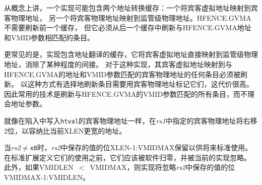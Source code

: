 \begin{commentary}
  从概念上讲，一个实现可能包含两个地址转换缓存：一个将宾客虚拟地址映射到宾客物理地址，
  另一个将宾客物理地址映射到监管级物理地址。HFENCE.GVMA不需要刷新前一个缓存，
  但它必须从后一个缓存中刷新与HFENCE.GVMA地址和VMID参数相匹配的条目。

更常见的是，实现包含地址翻译的缓存，它将宾客虚拟地址直接映射到监管级物理地址，消除了某种程度的间接。
对于这种实现，其宾客虚拟地址映射到与HFENCE.GVMA的地址和VMID参数匹配的宾客物理地址的任何条目必须被刷新。
以这种方式有选择地刷新条目需要用宾客物理地址标记它们，这代价很高。因此常用的技术是刷新与HFENCE.GVMA的VMID参数匹配的所有条目，而不理会地址参数。
\end{commentary}

\begin{commentary}
  就像在陷入中写入{\tt htval}的宾客物理地址一样，在{\em rs1}中指定的宾客物理地址将右移2位，以容纳比当前XLEN更宽的地址。
\end{commentary}

当{\em rs2}$\neq${\tt x0}时，{\em rs2}中保存的值的位XLEN-1:VMIDMAX保留以供将来标准使用。
在标准扩展定义它们的使用之前，它们应该被软件归零，并被当前的实现忽略。
此外，如果VMIDLEN~$<$~VMIDMAX，则实现将忽略{\em rs2}中保存的值的位VMIDMAX-1:VMIDLEN。


